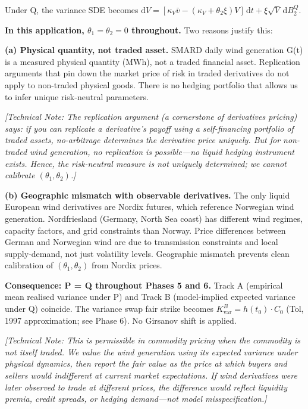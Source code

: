 \documentclass[11pt, a4paper, twoside]{article}
\begin{document}
Under Q, the variance SDE becomes $\mathrm{d}V = [\kappa_V \bar{v} - (\kappa_V + \theta_2 \xi) V] \, \mathrm{d}t + \xi \sqrt{V} \, \mathrm{d}B_2^Q$.

\textbf{In this application, $\theta_1 = \theta_2 = 0$ throughout.} Two reasons justify this:

\textbf{(a) Physical quantity, not traded asset.} SMARD daily wind generation G(t) is a measured physical quantity (MWh), not a traded financial asset. Replication arguments that pin down the market price of risk in traded derivatives do not apply to non-traded physical goods. There is no hedging portfolio that allows us to infer unique risk-neutral parameters.

\textit{[Technical Note: The replication argument (a cornerstone of derivatives pricing) says: if you can replicate a derivative's payoff using a self-financing portfolio of traded assets, no-arbitrage determines the derivative price uniquely. But for non-traded wind generation, no replication is possible---no liquid hedging instrument exists. Hence, the risk-neutral measure is not uniquely determined; we cannot calibrate $(\theta_1, \theta_2)$.]}

\textbf{(b) Geographic mismatch with observable derivatives.} The only liquid European wind derivatives are Nordix futures, which reference Norwegian wind generation. Nordfriesland (Germany, North Sea coast) has different wind regimes, capacity factors, and grid constraints than Norway. Price differences between German and Norwegian wind are due to transmission constraints and local supply-demand, not just volatility levels. Geographic mismatch prevents clean calibration of $(\theta_1, \theta_2)$ from Nordix prices.

\textbf{Consequence: P = Q throughout Phases 5 and 6.} Track A (empirical mean realised variance under P) and Track B (model-implied expected variance under Q) coincide. The variance swap fair strike becomes $K_{\text{var}}^B = h(t_0) \cdot C_0$ (Tol, 1997 approximation; see Phase 6). No Girsanov shift is applied.

\textit{[Technical Note: This is permissible in commodity pricing when the commodity is not itself traded. We value the wind generation using its expected variance under physical dynamics, then report the fair value as the price at which buyers and sellers would indifferent at current market expectations. If wind derivatives were later observed to trade at different prices, the difference would reflect liquidity premia, credit spreads, or hedging demand---not model misspecification.]}
\end{document}
